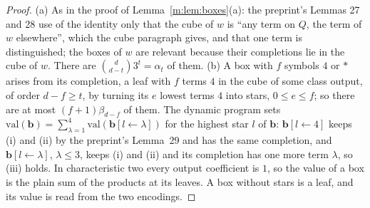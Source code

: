 \documentclass[11pt]{article}
\theoremstyle{definition}
\theoremstyle{remark}
\newcommand{\val}{\mathrm{val}}
\begin{document}
\begin{proof}
(a) As in the proof of Lemma~\ref{m:lem:boxes}(a): the preprint's Lemmas 27 and 28 use of the identity only that the cube of $w$ is ``any term on $Q$, the term of $w$ elsewhere'', which the cube paragraph gives, and that one term is distinguished; the boxes of $w$ are relevant because their completions lie in the cube of $w$. There are $\binom d{d-t}3^t=\alpha_t$ of them. (b) A box with $f$ symbols $4$ or $\ast$ arises from its completion, a leaf with $f$ terms $4$ in the cube of some class output, of order $d-f\ge t$, by turning its $e$ lowest terms $4$ into stars, $0\le e\le f$; so there are at most $(f+1)\beta_{d-f}$ of them. The dynamic program sets $\val(\mathbf b)=\sum_{\lambda=1}^4\val(\mathbf b[l\leftarrow\lambda])$ for the highest star $l$ of $\mathbf b$: $\mathbf b[l\leftarrow4]$ keeps (i) and (ii) by the preprint's Lemma~29 and has the same completion, and $\mathbf b[l\leftarrow\lambda]$, $\lambda\le3$, keeps (i) and (ii) and its completion has one more term $\lambda$, so (iii) holds. In characteristic two every output coefficient is $1$, so the value of a box is the plain sum of the products at its leaves. A box without stars is a leaf, and its value is read from the two encodings.
\end{proof}
\end{document}
